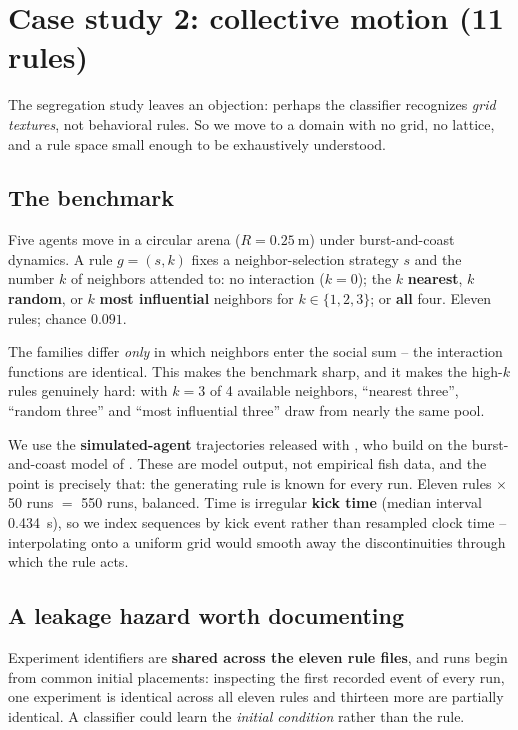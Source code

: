 \documentclass[11pt]{article}
\begin{document}
\section{Case study 2: collective motion (11 rules)}
\label{sec:fish}

The segregation study leaves an objection: perhaps the classifier recognizes
\emph{grid textures}, not behavioral rules. So we move to a domain with no grid, no
lattice, and a rule space small enough to be exhaustively understood.

\subsection{The benchmark}

Five agents move in a circular arena ($R = \SI{0.25}{\metre}$) under burst-and-coast
dynamics. A rule $g=(s,k)$ fixes a neighbor-selection strategy $s$ and the number $k$
of neighbors attended to: no interaction ($k{=}0$); the $k$ \textbf{nearest}, $k$
\textbf{random}, or $k$ \textbf{most influential} neighbors for $k \in \{1,2,3\}$; or
\textbf{all} four. Eleven rules; chance $0.091$.

The families differ \emph{only} in which neighbors enter the social sum -- the
interaction functions are identical. This makes the benchmark sharp, and it makes the
high-$k$ rules genuinely hard: with $k=3$ of 4 available neighbors, ``nearest three'',
``random three'' and ``most influential three'' draw from nearly the same pool.

We use the \textbf{simulated-agent} trajectories released with \citet{lei2020}, who
build on the burst-and-coast model of \citet{calovi2018}. These are model output, not
empirical fish data, and the point is precisely that: the generating rule is known for
every run. Eleven rules $\times$ 50 runs $=$ 550 runs, balanced. Time is irregular
\textbf{kick time} (median interval \SI{0.434}{\second}), so we index sequences by
kick event rather than resampled clock time -- interpolating onto a uniform grid would
smooth away the discontinuities through which the rule acts.

\subsection{A leakage hazard worth documenting}

Experiment identifiers are \textbf{shared across the eleven rule files}, and runs
begin from common initial placements: inspecting the first recorded event of every
run, one experiment is identical across all eleven rules and thirteen more are
partially identical. A classifier could learn the \emph{initial condition} rather than
the rule.
\end{document}
